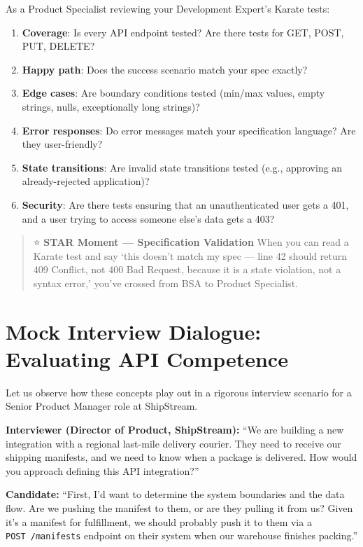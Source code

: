 As a Product Specialist reviewing your Development Expert's Karate
tests:

\begin{enumerate}
\def\labelenumi{\arabic{enumi}.}
\tightlist
\item
  \textbf{Coverage}: Is every API endpoint tested? Are there tests for
  GET, POST, PUT, DELETE?
\item
  \textbf{Happy path}: Does the success scenario match your spec
  exactly?
\item
  \textbf{Edge cases}: Are boundary conditions tested (min/max values,
  empty strings, nulls, exceptionally long strings)?
\item
  \textbf{Error responses}: Do error messages match your specification
  language? Are they user-friendly?
\item
  \textbf{State transitions}: Are invalid state transitions tested
  (e.g., approving an already-rejected application)?
\item
  \textbf{Security}: Are there tests ensuring that an unauthenticated
  user gets a 401, and a user trying to access someone else's data gets
  a 403?
\end{enumerate}

\begin{quote}
⭐ \textbf{STAR Moment --- Specification Validation} When you can read a
Karate test and say `this doesn't match my spec --- line 42 should
return 409 Conflict, not 400 Bad Request, because it is a state
violation, not a syntax error,' you've crossed from BSA to Product
Specialist.
\end{quote}

\section{Mock Interview Dialogue: Evaluating API
Competence}\label{mock-interview-dialogue-evaluating-api-competence}

Let us observe how these concepts play out in a rigorous interview
scenario for a Senior Product Manager role at ShipStream.

\textbf{Interviewer (Director of Product, ShipStream):} ``We are
building a new integration with a regional last-mile delivery courier.
They need to receive our shipping manifests, and we need to know when a
package is delivered. How would you approach defining this API
integration?''

\textbf{Candidate:} ``First, I'd want to determine the system boundaries
and the data flow. Are we pushing the manifest to them, or are they
pulling it from us? Given it's a manifest for fulfillment, we should
probably push it to them via a \texttt{POST\ /manifests} endpoint on
their system when our warehouse finishes packing.''


